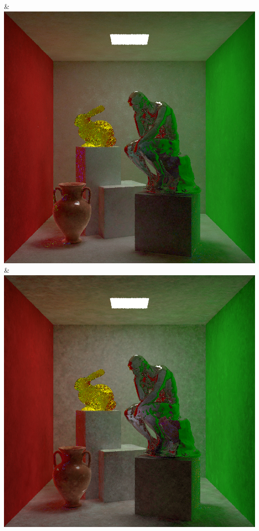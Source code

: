 & \includegraphics[width=\linewidth]{figures/py/tests/sppc_optimization/nrc+sppc14@1_1spp_thinker.png}
& \includegraphics[width=\linewidth]{figures/py/tests/sppc_optimization/nrc+sppc14@4_1spp_thinker.png}
